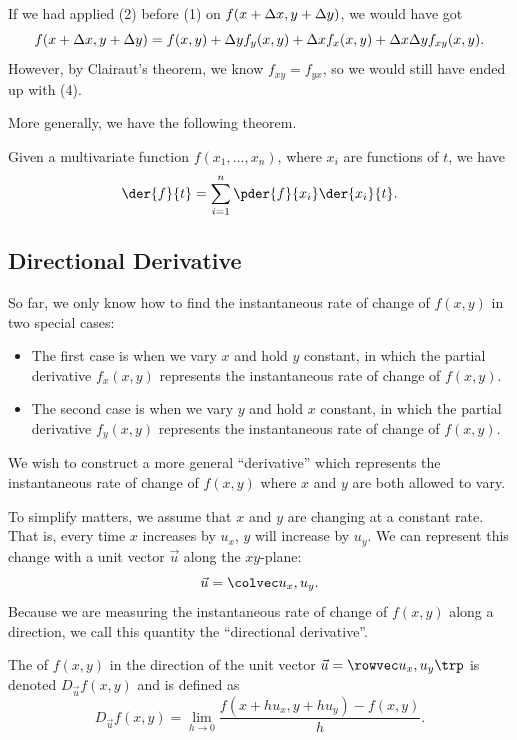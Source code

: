 If we had applied (2) before (1) on $f(x + \Delta x, y + \Delta y)$, we would have got \[f(x + \Delta x, y + \Delta y) = f(x, y) + \Delta y f_y(x,y) + \Delta x f_x(x, y) + \Delta x\Delta y f_{xy}(x, y).\] However, by Clairaut's theorem, we know $f_{xy} = f_{yx}$, so we would still have ended up with (4).

More generally, we have the following theorem.

\begin{theorem}
    Given a multivariate function $f(x_1, \dots, x_n)$, where $x_i$ are functions of $t$, we have \[\der{f}{t} = \sum_{i = 1}^n \pder{f}{x_i} \der{x_i}{t}.\]
\end{theorem}

\subsection{Directional Derivative}

So far, we only know how to find the instantaneous rate of change of $f(x, y)$ in two special cases:
\begin{itemize}
    \item The first case is when we vary $x$ and hold $y$ constant, in which the partial derivative $f_x(x, y)$ represents the instantaneous rate of change of $f(x, y)$.
    \item The second case is when we vary $y$ and hold $x$ constant, in which the partial derivative $f_y(x, y)$ represents the instantaneous rate of change of $f(x, y)$.
\end{itemize}
We wish to construct a more general ``derivative'' which represents the instantaneous rate of change of $f(x, y)$ where $x$ and $y$ are both allowed to vary.

To simplify matters, we assume that $x$ and $y$ are changing at a constant rate. That is, every time $x$ increases by $u_x$, $y$ will increase by $u_y$. We can represent this change with a unit vector $\vec u$ along the $xy$-plane: \[\vec u = \cvecii{u_x}{u_y}.\] Because we are measuring the instantaneous rate of change of $f(x, y)$ along a direction, we call this quantity the ``directional derivative''.

\begin{definition}
    The  of $f(x, y)$ in the direction of the unit vector $\vec u = \cveciix{u_x}{u_y}$ is denoted $D_{\vec u} f(x, y)$ and is defined as \[D_{\vec u} f(x, y) = \lim_{h \to 0} \frac{f(x + h u_x, y + h u_y) - f(x, y)}{h}.\]
\end{definition}

